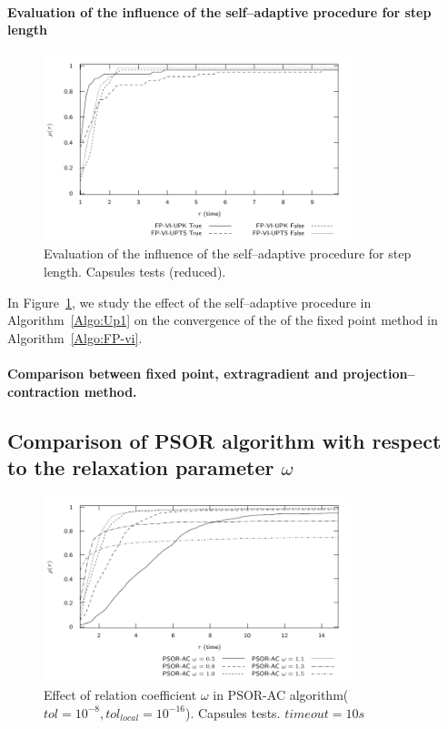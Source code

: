 \paragraph{Evaluation of the influence of the self--adaptive procedure for step length}
\label{Sec:Comparison,VI,step-length}
\begin{figure}
  \centering
  \includegraphics[width=0.8\textwidth]{../figure/profile-Capsules-reduced-FixedPoint-VI-1_10-time.pdf}
  \caption{Evaluation of the influence of the self--adaptive procedure for step length. Capsules tests (reduced).}
  \label{fig:profile-Capsules-reduced--FixedPoint-VI-1_10-time}
\end{figure}
In Figure~\ref{fig:profile-Capsules-reduced--FixedPoint-VI-1_10-time}, we study the effect of the self--adaptive procedure in Algorithm~\ref{Algo:Up1} on the convergence of the of the fixed point method in Algorithm~\ref{Algo:FP-vi}.


\paragraph{Comparison between fixed point, extragradient and projection--contraction method.}


\subsection{Comparison of PSOR algorithm with respect to  the relaxation parameter $\omega$}

\begin{figure}
  \centering
  \includegraphics[width=0.8\textwidth]{../figure/profile-Capsules-PSOR-1_15-time.pdf}
  \caption{Effect of relation coefficient $\omega$ in PSOR-AC algorithm( $tol = 10^{-8}, tol_{local} = 10^{-16}$). Capsules tests. $timeout=10s$}
  \label{fig:profile-Capsules-PSOR-1_15-time}
\end{figure}

